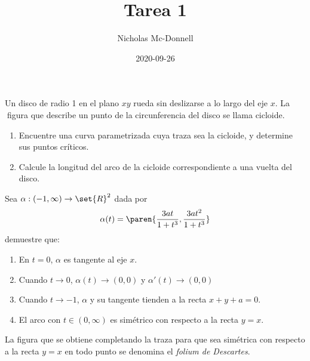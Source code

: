 \documentclass{homework}
\title{Tarea 1}
\date{2020-09-26}
\author{Nicholas Mc-Donnell}
\begin{document}
\maketitle
\newpage
{}


\begin{prob}
    Un disco de radio 1 en el plano \(xy\) rueda sin deslizarse a lo largo del eje \(x\). La figura que describe un punto de la circunferencia del disco se llama cicloide.
\begin{enumerate}
    \item Encuentre una curva parametrizada cuya traza sea la cicloide, y determine sus puntos críticos.
    \item Calcule la longitud del arco de la cicloide correspondiente a una vuelta del disco.
\end{enumerate}
\end{prob}

\begin{sol}
    
\end{sol}


\begin{prob}
    Sea \(\alpha:(-1,\infty)\rightarrow\set{R}^2\) dada por
    \begin{equation*}
        \alpha(t)=\paren{\frac{3at}{1+t^3},\frac{3at^2}{1+t^3}}
    \end{equation*}
    demuestre que:
    \begin{enumerate}
        \item En \(t=0\), \(\alpha\) es tangente al eje \(x\).
        \item Cuando \(t\rightarrow 0\), \(\alpha(t)\rightarrow(0,0)\) y \(\alpha'(t)\rightarrow(0,0)\)
        \item Cuando \(t\rightarrow-1\), \(\alpha\) y su tangente tienden a la recta \(x+y+a=0\).
        \item El arco con \(t\in(0,\infty)\) es simétrico con respecto a la recta \(y=x\).
    \end{enumerate}
    La figura que se obtiene completando la traza para que sea simétrica con respecto a la recta \(y=x\) en todo punto se denomina el \textit{folium de Descartes}.
\end{prob}

\begin{sol}
    
\end{sol}
\end{document}
